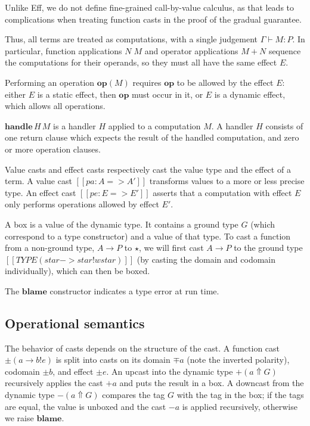 Unlike Eff, we do not define fine-grained call-by-value calculus, as that leads
to complications when treating function casts in the proof of the gradual guarantee.

Thus, all terms are treated as computations, with a single judgement $\Gamma \vdash M : P$.
In particular, function applications $N\;M$ and operator applications $M + N$
sequence the computations for their operands, so they must all have the same
effect $E$.

Performing an operation $\mathbf{op}(M)$ requires $\mathbf{op}$ to be allowed
by the effect $E$: either $E$ is a static effect, then $\mathbf{op}$ must occur
in it, or $E$ is a dynamic effect, which allows all operations.

$\mathbf{handle}\,H\,M$ is a handler $H$ applied to a computation $M$.
A handler $H$ consists of one return clause which expects the result of the
handled computation, and zero or more operation clauses.

Value casts and effect casts respectively cast the value type and the effect of a term.
A value cast $[[pa : A => A']]$ transforms values to a more or less precise type.
An effect cast $[[pe : E => E']]$ asserts that a computation with effect $E$
only performs operations allowed by effect $E'$.

A box is a value of the dynamic type. It contains a ground type $G$
(which correspond to a type constructor) and a value of that type.
To cast a function from a non-ground type, $A \to P$ to $\star$,
we will first cast $A \to P$ to the ground type
$[[TYPE ( star -> star ! wstar )]]$ (by casting the domain and codomain individually),
which can then be boxed.

The $\mathbf{blame}$ constructor indicates a type error at run time.

\subsection{Operational semantics}

The behavior of casts depends on the structure of the cast.
A function cast $\pm (a \to b ! e)$
is split into casts on its domain $\mp a$ (note the inverted polarity), codomain $\pm b$, and effect $\pm e$.
An upcast into the dynamic type $+ (a \Uparrow G)$
recursively applies the cast $+ a$ and puts the result in a box.
A downcast from the dynamic type $- (a \Uparrow G)$ compares
the tag $G$ with the tag in the box; if the tags are equal, the value is
unboxed and the cast $- a$ is applied recursively,
otherwise we raise $\mathbf{blame}$.

